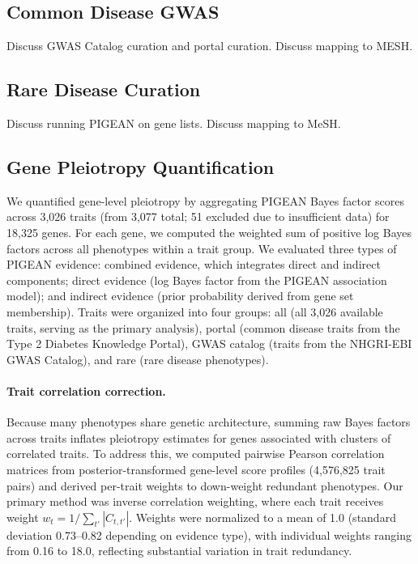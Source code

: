 \subsection{Common Disease GWAS}
Discuss GWAS Catalog curation and portal curation. Discuss mapping to MESH.

\subsection{Rare Disease Curation}
Discuss running PIGEAN on gene lists. Discuss mapping to MeSH.

\subsection{Gene Pleiotropy Quantification}

We quantified gene-level pleiotropy by aggregating PIGEAN Bayes factor scores across 3,026 traits (from 3,077 total; 51 excluded due to insufficient data) for 18,325 genes. For each gene, we computed the weighted sum of positive log Bayes factors across all phenotypes within a trait group. We evaluated three types of PIGEAN evidence: combined evidence, which integrates direct and indirect components; direct evidence (log Bayes factor from the PIGEAN association model); and indirect evidence (prior probability derived from gene set membership). Traits were organized into four groups: all (all 3,026 available traits, serving as the primary analysis), portal (common disease traits from the Type 2 Diabetes Knowledge Portal), GWAS catalog (traits from the NHGRI-EBI GWAS Catalog), and rare (rare disease phenotypes).

\paragraph{Trait correlation correction.}
Because many phenotypes share genetic architecture, summing raw Bayes factors across traits inflates pleiotropy estimates for genes associated with clusters of correlated traits. To address this, we computed pairwise Pearson correlation matrices from posterior-transformed gene-level score profiles (4,576,825 trait pairs) and derived per-trait weights to down-weight redundant phenotypes. Our primary method was inverse correlation weighting, where each trait receives weight $w_t = 1 / \sum_{t'} |C_{t,t'}|$. Weights were normalized to a mean of 1.0 (standard deviation 0.73--0.82 depending on evidence type), with individual weights ranging from 0.16 to 18.0, reflecting substantial variation in trait redundancy.

